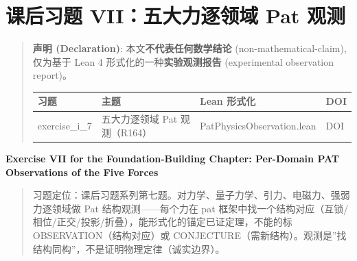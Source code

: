 \documentclass[
]{article}
\author{}
\date{}
\newcounter{none} %
\begin{document}
\section{课后习题 VII：五大力逐领域 Pat
观测}\label{ux7b51ux57faux7bc7ux8bfeux540eux4e60ux9898-viiux4e94ux5927ux529bux9010ux9886ux57df-pat-ux89c2ux6d4b}

\begin{quote}
\textbf{声明 (Declaration)}: 本文\textbf{不代表任何数学结论}
(non-mathematical-claim), 仅为基于 Lean 4
形式化的一种\textbf{实验观测报告} (experimental observation report)。

{\def\LTcaptype{none} %
\begin{longtable}[]{@{}
 >{\raggedright\arraybackslash}p{}
 >{\raggedright\arraybackslash}p{}
 >{\raggedright\arraybackslash}p{}
 >{\raggedright\arraybackslash}p{}@{}}
\toprule\noalign{}
\begin{minipage}[b]{\linewidth}\raggedright
习题
\end{minipage} & \begin{minipage}[b]{\linewidth}\raggedright
主题
\end{minipage} & \begin{minipage}[b]{\linewidth}\raggedright
Lean 形式化
\end{minipage} & \begin{minipage}[b]{\linewidth}\raggedright
DOI
\end{minipage} \\
\midrule\noalign{}
\endhead
\bottomrule\noalign{}
\endlastfoot
exercise\_i\_7 & 五大力逐领域 Pat 观测（R164） &
PatPhysicsObservation.lean & DOI \\
\end{longtable}
}
\end{quote}

\textbf{Exercise VII for the Foundation-Building Chapter: Per-Domain PAT
Observations of the Five Forces}

\begin{quote}
习题定位：课后习题系列第七题。对力学、量子力学、引力、电磁力、强弱力逐领域做
Pat 结构观测------每个力在 pat
框架中找一个结构对应（互锁/相位/正交/投影/折叠），能形式化的锚定已证定理，不能的标
OBSERVATION（结构对应）或
CONJECTURE（需新结构）。观测是''找结构同构''，不是证明物理定律（诚实边界）。
\end{quote}
\end{document}
